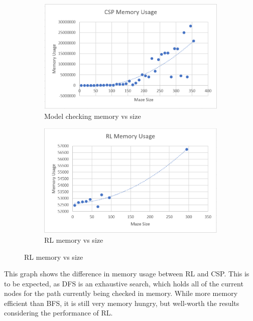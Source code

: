 \documentclass{article}
\newcommand\tab[1][1cm]{\hspace*{#1}}
\begin{document}
        \begin{figure}[ht]
            \begin{subfigure}{.5\textwidth}
                \centering
                \includegraphics[scale=0.5]{assets/CSPMemoryVsSize.PNG}
                \caption{Model checking memory vs size}
            \end{subfigure}
            \begin{subfigure}{.5\textwidth}
                \centering
                \includegraphics[scale=0.5]{assets/RlMemoryVsSize.PNG}
                \caption{RL memory vs size}
                \label{sonarCode}
            \end{subfigure}
        \end{figure}

         \tab This graph shows the difference in memory usage between RL and CSP. 
         This is to be expected, as DFS is an exhaustive search, which holds 
         all of the current nodes for the path currently being checked in 
         memory. While more memory efficient than BFS, it is still very 
         memory hungry, but well-worth the results considering the 
         performance of RL.
\end{document}
